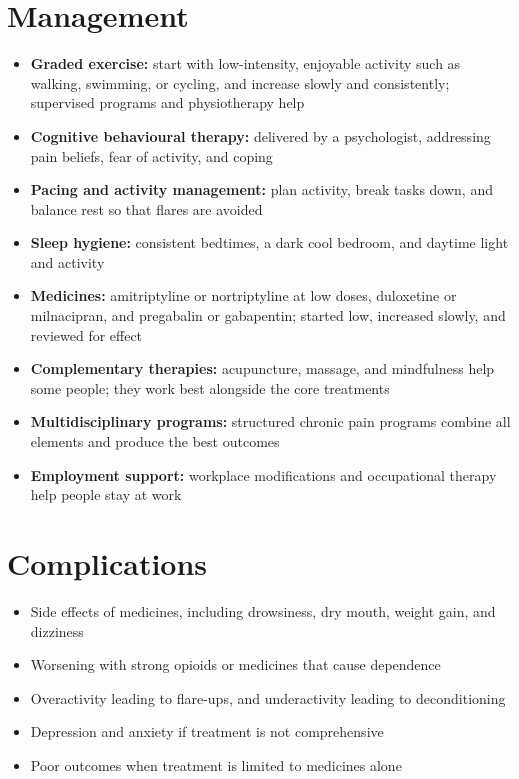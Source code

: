 \section*{Management}
\begin{itemize}
    \item \textbf{Graded exercise:} start with low-intensity, enjoyable activity such as walking, swimming, or cycling, and increase slowly and consistently; supervised programs and physiotherapy help
    \item \textbf{Cognitive behavioural therapy:} delivered by a psychologist, addressing pain beliefs, fear of activity, and coping
    \item \textbf{Pacing and activity management:} plan activity, break tasks down, and balance rest so that flares are avoided
    \item \textbf{Sleep hygiene:} consistent bedtimes, a dark cool bedroom, and daytime light and activity
    \item \textbf{Medicines:} amitriptyline or nortriptyline at low doses, duloxetine or milnacipran, and pregabalin or gabapentin; started low, increased slowly, and reviewed for effect
    \item \textbf{Complementary therapies:} acupuncture, massage, and mindfulness help some people; they work best alongside the core treatments
    \item \textbf{Multidisciplinary programs:} structured chronic pain programs combine all elements and produce the best outcomes
    \item \textbf{Employment support:} workplace modifications and occupational therapy help people stay at work
\end{itemize}

\section*{Complications}
\begin{itemize}
    \item Side effects of medicines, including drowsiness, dry mouth, weight gain, and dizziness
    \item Worsening with strong opioids or medicines that cause dependence
    \item Overactivity leading to flare-ups, and underactivity leading to deconditioning
    \item Depression and anxiety if treatment is not comprehensive
    \item Poor outcomes when treatment is limited to medicines alone
\end{itemize}

